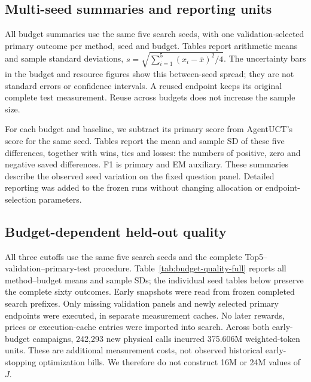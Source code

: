 \subsection{Multi-seed summaries and reporting units}
All budget summaries use the same five search seeds, with one validation-selected
primary outcome per method, seed and budget. Tables report arithmetic means and
sample standard deviations, $s=\sqrt{\sum_{i=1}^{5}(x_i-\bar x)^2/4}$.
The uncertainty bars in the budget and resource figures show this between-seed
spread; they are not standard errors or confidence intervals. A reused endpoint
keeps its original complete test measurement. Reuse across budgets does not
increase the sample size.

For each budget and baseline, we subtract its primary score from AgentUCT's
score for the same seed. Tables report the mean and sample SD of these five
differences, together with wins, ties and losses: the numbers of positive,
zero and negative saved differences. F1 is primary and EM auxiliary.
These summaries describe the observed seed variation on the fixed question
panel. Detailed reporting was added to the frozen runs without changing
allocation or endpoint-selection parameters.

\subsection{Budget-dependent held-out quality}
\label{sec:budget-detail}
All three cutoffs use the same five search seeds and the complete
Top5--validation--primary-test procedure. Table~\ref{tab:budget-quality-full}
reports all method--budget means and sample SDs; the individual seed tables
below preserve the complete sixty outcomes. Early snapshots were read from
frozen completed search prefixes. Only missing validation panels and newly
selected primary endpoints were executed, in separate measurement caches.
No later rewards, prices or execution-cache entries were imported into search.
Across both early-budget campaigns, 242,293 new physical calls incurred
375.606M weighted-token units. These are additional measurement costs, not
observed historical early-stopping optimization bills. We therefore do not
construct 16M or 24M values of $J$.

\begin{table}[htbp]
\centering\small
\caption{Complete matched-five-seed budget analysis. Primary test F1 and EM
are reported as mean $\pm$ sample SD. Each method--budget row has five seeds;
reused test measurements across budgets are not additional independent trials.}
\label{tab:budget-quality-full}

\end{table}

